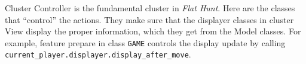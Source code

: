 Cluster Controller is the fundamental cluster in \emph{Flat Hunt}. Here are the classes that ``control'' the actions. They make sure that the displayer classes in cluster View display the proper information, which they get from the Model classes. For example, feature prepare in class \texttt{GAME} controls the display update by calling \texttt{current\_player.displayer.display\_after\_move}.

